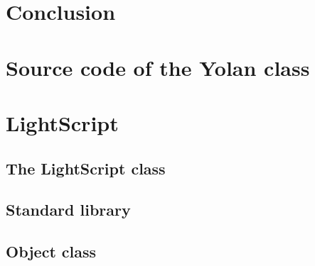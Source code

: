 \documentclass[11pt]{report}
\begin{document}
\chapter{Conclusion}
\label{conclusion}


%
%

\newpage
{}



\appendix



\chapter{Source code of the Yolan class}


\chapter{LightScript}
\section{The LightScript class}

\section{Standard library}

\section{Object class}



\newpage
{}
\printindex
\end{document}
